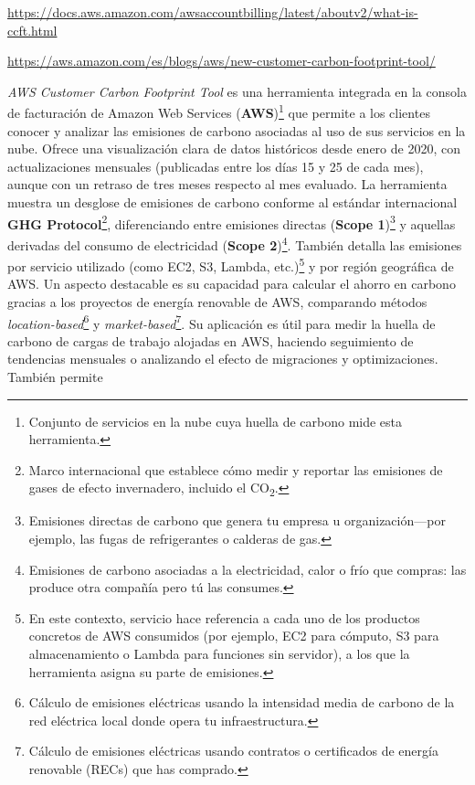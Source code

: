 \documentclass[12pt,a4paper]{report}
\begin{document}
\href{https://docs.aws.amazon.com/awsaccountbilling/latest/aboutv2/what-is-ccft.html}{https://docs.aws.amazon.com/awsaccountbilling/latest/aboutv2/what-is-ccft.html}

\href{https://aws.amazon.com/es/blogs/aws/new-customer-carbon-footprint-tool/}{https://aws.amazon.com/es/blogs/aws/new-customer-carbon-footprint-tool/}

\textit{AWS Customer Carbon Footprint Tool} es una herramienta integrada en la consola
de facturación de Amazon Web Services (\textbf{AWS})\footnote{Conjunto de servicios en la nube cuya huella de carbono mide esta herramienta.} que permite a los clientes
conocer y analizar las emisiones de carbono asociadas al uso de sus servicios
en la nube. Ofrece una visualización clara de datos históricos desde enero de
2020, con actualizaciones mensuales (publicadas entre los días 15 y 25 de cada
mes), aunque con un retraso de tres meses respecto al mes evaluado. La
herramienta muestra un desglose de emisiones de carbono conforme al estándar
internacional \textbf{GHG Protocol}\footnote{Marco internacional que establece cómo medir y reportar las emisiones de gases de efecto invernadero, incluido el CO\textsubscript{2}.}, diferenciando entre emisiones directas
(\textbf{Scope 1})\footnote{Emisiones directas de carbono que genera tu empresa u organización—por ejemplo, las fugas de refrigerantes o calderas de gas.} y aquellas derivadas del consumo de electricidad
(\textbf{Scope 2})\footnote{Emisiones de carbono asociadas a la electricidad, calor o frío que compras: las produce otra compañía pero tú las consumes.}. También detalla las emisiones por servicio utilizado (como
EC2, S3, Lambda, etc.)\footnote{En este contexto, servicio hace referencia a cada uno de los productos concretos de AWS consumidos (por ejemplo, EC2 para cómputo, S3 para almacenamiento o Lambda para funciones sin servidor), a los que la herramienta asigna su parte de emisiones.} y por región geográfica de AWS. Un aspecto destacable es
su capacidad para calcular el ahorro en carbono gracias a los proyectos de
energía renovable de AWS, comparando métodos \textit{location-based}\footnote{Cálculo de emisiones eléctricas usando la intensidad media de carbono de la red eléctrica local donde opera tu infraestructura.} y
\textit{market-based}\footnote{Cálculo de emisiones eléctricas usando contratos o certificados de energía renovable (RECs) que has comprado.}. Su aplicación es útil para medir la huella de carbono de
cargas de trabajo alojadas en AWS, haciendo seguimiento de tendencias mensuales
o analizando el efecto de migraciones y optimizaciones. También permite
\end{document}
